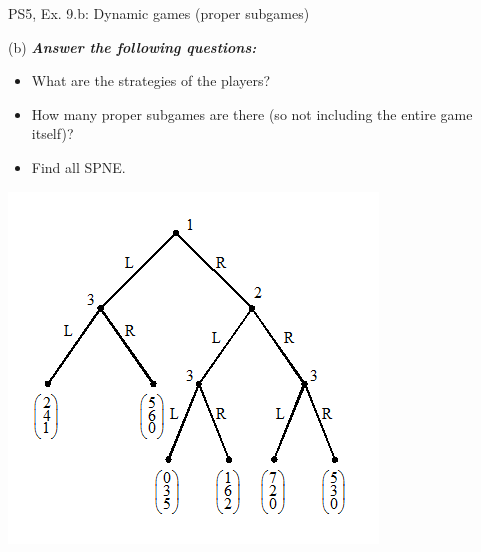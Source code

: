 \begin{frame}{PS5, Ex. 9.b: Dynamic games (proper subgames)}
  \begin{multicols}{2}
    (b) \textbf{\textit{Answer the following questions:}}
    \begin{itemize}
      \item What are the strategies of the players?
      \item How many proper subgames are there (so not including the entire game itself)?
      \item Find all SPNE.
    \end{itemize}
    \vfill\null \columnbreak
    \includegraphics[width=1.2\columnwidth]{figures/Set_5_figure_2}
    \vfill\null
  \end{multicols}
\end{frame}

